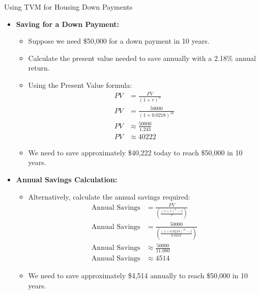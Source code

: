 \documentclass{beamer}
\begin{document}
\begin{frame}{Using TVM for Housing Down Payments}
    \begin{itemize}
        \item \textbf{Saving for a Down Payment:}
        \begin{itemize}
            \item Suppose we need \$50,000 for a down payment in 10 years.
            \item Calculate the present value needed to save annually with a 2.18\% annual return.
            \item Using the Present Value formula:
            \begin{align*}
                PV &= \frac{FV}{(1 + r)^n} \\
                PV &= \frac{50000}{(1 + 0.0218)^{10}} \\
                PV &\approx \frac{50000}{1.243} \\
                PV &\approx 40222
            \end{align*}
            \item We need to save approximately \$40,222 today to reach \$50,000 in 10 years.
        \end{itemize}
        \item \textbf{Annual Savings Calculation:}
        \begin{itemize}
            \item Alternatively, calculate the annual savings required:
            \begin{align*}
                \text{Annual Savings} &= \frac{FV}{\left( \frac{(1 + r)^n - 1}{r} \right)} \\
                \text{Annual Savings} &= \frac{50000}{\left( \frac{(1 + 0.0218)^{10} - 1}{0.0218} \right)} \\
                \text{Annual Savings} &\approx \frac{50000}{11.080} \\
                \text{Annual Savings} &\approx 4514
            \end{align*}
            \item We need to save approximately \$4,514 annually to reach \$50,000 in 10 years.
        \end{itemize}
    \end{itemize}
\end{frame}
\end{document}
